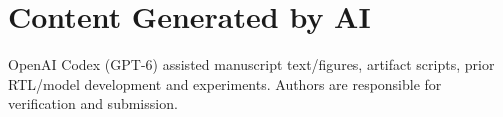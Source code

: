 \section*{Content Generated by AI}
OpenAI Codex (GPT-6) assisted manuscript text/figures, artifact scripts, prior RTL/model development and experiments. Authors are responsible for verification and submission.
